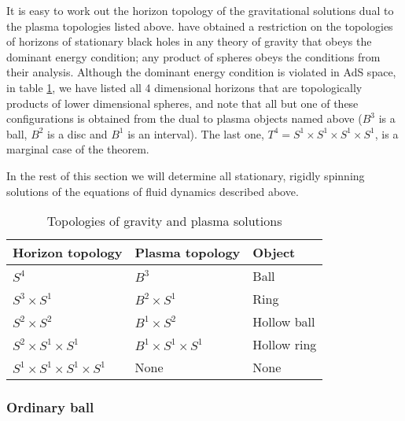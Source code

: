 It is easy to work out the horizon topology of the gravitational
solutions dual to the plasma topologies listed above.
\cite{Galloway:2005mf} have obtained a restriction on the topologies
of horizons of stationary black holes in any theory of gravity that
obeys the dominant energy condition; any product of spheres obeys
the conditions from their analysis.  Although the dominant energy
condition is violated in AdS space, in table \ref{topology:tab}, we
have listed all 4 dimensional horizons that are topologically
products of lower dimensional spheres, and note that all but one of
these configurations is obtained from the dual to plasma objects
named above ($B^3$ is a ball, $B^2$ is a disc and $B^1$ is an
interval). The last one, $T^4 = S^1\times S^1\times S^1\times S^1$,
is a marginal case of the theorem.

In the rest of this section we will determine all stationary,
rigidly spinning solutions of the equations of fluid dynamics
described above.

\begin{table}
  \begin{center}
  \begin{tabular}{|l|l|l|}
    \hline
    Horizon topology & Plasma topology & Object \\
    \hline
    $S^4$                     & $B^3$                     & Ball \\
    $S^3\times S^1$           & $B^2\times S^1$           & Ring \\
    $S^2\times S^2$           & $B^1\times S^2$           & Hollow ball \\
    $S^2\times S^1\times S^1$ & $B^1\times S^1\times S^1$ & Hollow ring \\
    $S^1\times S^1\times S^1\times S^1$
                              & None                      & None \\
    \hline
  \end{tabular}
  \end{center}
  \caption{Topologies of gravity and plasma solutions}\label{topology:tab}
\end{table}



\subsubsection{Ordinary ball}\label{sec:oball4d}

